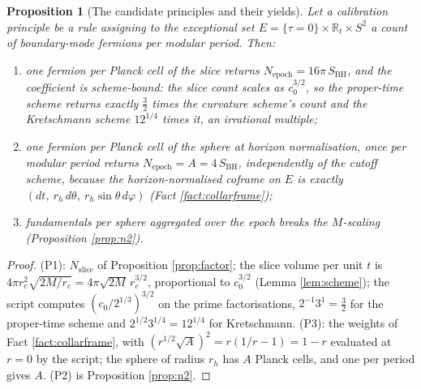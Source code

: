 \documentclass[11pt]{article}
\newtheorem{proposition}[theorem]{Proposition}
\theoremstyle{definition}
\newcommand{\R}{\mathbb{R}}
\newcommand{\SBH}{S_{\mathrm{BH}}}
\begin{document}
\begin{proposition}[The candidate principles and their yields]\label{prop:yields}
Let a calibration principle be a rule assigning to the exceptional set $E = \{\tau = 0\} \times \R_t \times S^2$ a count of boundary-mode fermions per modular period. Then:
\begin{enumerate}
\item[(P1)] \emph{one fermion per Planck cell of the slice} returns $N_{\mathrm{epoch}} = 16\pi\,\SBH$, and the coefficient is scheme-bound: the slice count scales as $c_0^{3/2}$, so the proper-time scheme returns exactly $\tfrac32$ times the curvature scheme's count and the Kretschmann scheme $12^{1/4}$ times it, an irrational multiple;
\item[(P3)] \emph{one fermion per Planck cell of the sphere at horizon normalisation, once per modular period} returns $N_{\mathrm{epoch}} = A = 4\,\SBH$, independently of the cutoff scheme, because the horizon-normalised coframe on $E$ is exactly $(dt,\ r_h\,d\theta,\ r_h\sin\theta\,d\varphi)$ (Fact \ref{fact:collarframe});
\item[(P2)] \emph{fundamentals per sphere aggregated over the epoch} breaks the $M$-scaling (Proposition \ref{prop:n2}).
\end{enumerate}
\end{proposition}

\begin{proof}
(P1): $N_{\mathrm{slice}}$ of Proposition \ref{prop:factor}; the slice volume per unit $t$ is $4\pi r_c^2\sqrt{2M/r_c} = 4\pi\sqrt{2M}\,r_c^{3/2}$, proportional to $c_0^{3/2}$ (Lemma \ref{lem:scheme}); the script computes $(c_0/2^{1/3})^{3/2}$ on the prime factorisations, $2^{-1}3^{1} = \tfrac32$ for the proper-time scheme and $2^{1/2}3^{1/4} = 12^{1/4}$ for Kretschmann. (P3): the weights of Fact \ref{fact:collarframe}, with $(r^{1/2}\sqrt A)^2 = r(1/r - 1) = 1 - r$ evaluated at $r = 0$ by the script; the sphere of radius $r_h$ has $A$ Planck cells, and one per period gives $A$. (P2) is Proposition \ref{prop:n2}.
\end{proof}
\end{document}
